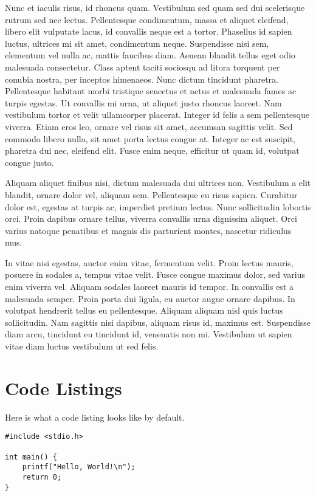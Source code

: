 Nunc et iaculis risus, id rhoncus quam. Vestibulum sed quam sed dui scelerisque rutrum sed nec lectus. Pellentesque condimentum, massa et aliquet eleifend, libero elit vulputate lacus, id convallis neque est a tortor. Phasellus id sapien luctus, ultrices mi sit amet, condimentum neque. Suspendisse nisi sem, elementum vel nulla ac, mattis faucibus diam. Aenean blandit tellus eget odio malesuada consectetur. Class aptent taciti sociosqu ad litora torquent per conubia nostra, per inceptos himenaeos. Nunc dictum tincidunt pharetra. Pellentesque habitant morbi tristique senectus et netus et malesuada fames ac turpis egestas. Ut convallis mi urna, ut aliquet justo rhoncus laoreet. Nam vestibulum tortor et velit ullamcorper placerat. Integer id felis a sem pellentesque viverra. Etiam eros leo, ornare vel risus sit amet, accumsan sagittis velit. Sed commodo libero nulla, sit amet porta lectus congue at. Integer ac est suscipit, pharetra dui nec, eleifend elit. Fusce enim neque, efficitur ut quam id, volutpat congue justo.

Aliquam aliquet finibus nisi, dictum malesuada dui ultrices non. Vestibulum a elit blandit, ornare dolor vel, aliquam sem. Pellentesque eu risus sapien. Curabitur dolor est, egestas at turpis ac, imperdiet pretium lectus. Nunc sollicitudin lobortis orci. Proin dapibus ornare tellus, viverra convallis urna dignissim aliquet. Orci varius natoque penatibus et magnis dis parturient montes, nascetur ridiculus mus.

In vitae nisi egestas, auctor enim vitae, fermentum velit. Proin lectus mauris, posuere in sodales a, tempus vitae velit. Fusce congue maximus dolor, sed varius enim viverra vel. Aliquam sodales laoreet mauris id tempor. In convallis est a malesuada semper. Proin porta dui ligula, eu auctor augue ornare dapibus. In volutpat hendrerit tellus eu pellentesque. Aliquam aliquam nisl quis luctus sollicitudin. Nam sagittis nisi dapibus, aliquam risus id, maximus est. Suspendisse diam arcu, tincidunt eu tincidunt id, venenatis non mi. Vestibulum ut sapien vitae diam luctus vestibulum ut sed felis.

\section{Code Listings}

Here is what a code listing looks like by default.

\begin{lstlisting}
#include <stdio.h>

int main() {
    printf("Hello, World!\n");
    return 0;
}
\end{lstlisting}

